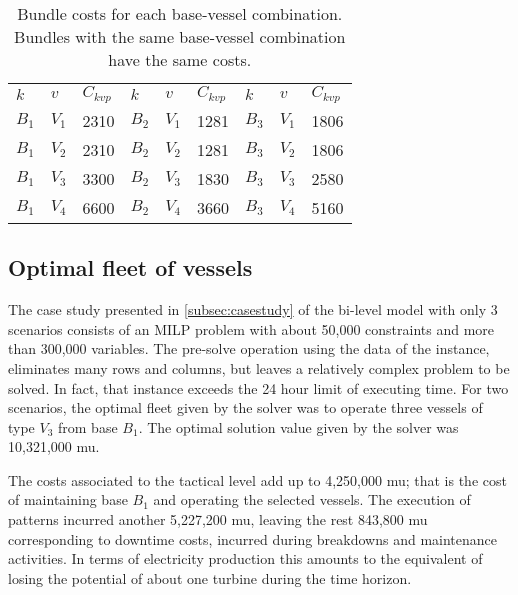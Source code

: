 \begin{table}[]
\centering
\caption{Bundle costs for each base-vessel combination. Bundles with the same base-vessel combination have the same costs.}
\label{tab:costbundle}
\begin{tabular}{lll|lll|lll}
$k$  & $v$ & $C_{kvp}$ & $k$  & $v$ & $C_{kvp}$ & $k$  & $v$ & $C_{kvp}$  \\
$B_1$ & $V_1$       & 2310    & $B_2$ & $V_1$       & 1281    & $B_3$ & $V_1$       & 1806    \\
$B_1$ & $V_2$       & 2310    & $B_2$ & $V_2$       & 1281    & $B_3$ & $V_2$       & 1806    \\
$B_1$ & $V_3$       & 3300    & $B_2$ & $V_3$       & 1830    & $B_3$ & $V_3$       & 2580    \\
$B_1$ & $V_4$       & 6600    & $B_2$ & $V_4$       & 3660    & $B_3$ & $V_4$       & 5160
\end{tabular}
\end{table}

\subsection{Optimal fleet of vessels}

The case study presented in \ref{subsec:casestudy} of the bi-level model with only 3 scenarios consists of an  MILP problem with about 50,000  constraints and more than 300,000 variables. The pre-solve operation using the data of the instance, eliminates many rows and columns, but leaves a relatively complex problem to be solved. In fact, that instance exceeds the 24 hour limit of executing time. For two scenarios, the optimal fleet given by the solver was to operate three vessels of type $V_3$ from base $B_1$. The optimal solution value given by the solver was 10,321,000 mu.


The costs associated to the tactical level add up to 4,250,000 mu; that is the cost of maintaining base $B_1$ and operating the selected vessels. The execution of patterns incurred another 5,227,200 mu, leaving the rest 843,800 mu corresponding to downtime costs, incurred during breakdowns and maintenance activities.
In terms of electricity production this amounts to the equivalent of losing the potential of about one turbine during the time horizon.

